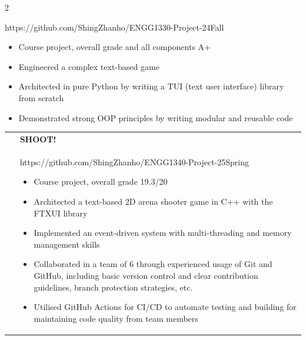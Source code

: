 \documentclass[10pt,a4paper,withhypeper,normalphoto]{altacv}
\makeatletter
\newcommand{\cvachievementAlt}[3]{%
  \begin{tabularx}{\linewidth}{@{}p{2em} @{\hspace{1ex}} >{\raggedright\arraybackslash}X@{}}
  \multirow{2}{*}{\,\,\Large\color{accent}#1} & \bfseries\textcolor{emphasis}{#2}\\
  & #3
  \end{tabularx}%
  \smallskip
}
\makeatother
\begin{document}
\begin{paracol}{2}





{
{\small https://github.com/ShingZhanho/ENGG1330-Project-24Fall}
\begin{itemize}
  \item Course project, overall grade and all components A+
  \item Engineered a complex text-based game
  \item Architected in pure Python by writing a TUI (text user interface) library from scratch
  \item Demonstrated strong OOP principles by writing modular and reusable code
\end{itemize}
}

\divider

\cvachievementAlt{\simpleicon{cplusplus}}{SHOOT!}{
{\small https://github.com/ShingZhanho/ENGG1340-Project-25Spring}
\begin{itemize}
  \item Course project, overall grade 19.3/20
  \item Architected a text-based 2D arena shooter game in C++ with the FTXUI library
  \item Implemented an event-driven system with multi-threading and memory management skills
  \item Collaborated in a team of 6 through experienced usage of Git and GitHub, including basic version control and clear contribution guidelines, branch protection strategies, etc.
  \item Utilised GitHub Actions for CI/CD to automate testing and building for maintaining code quality from team members
\end{itemize}
}



\end{paracol}
\end{document}
